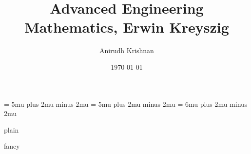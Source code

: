 \documentclass[10pt, oneside]{book}
\author{Anirudh Krishnan}
\title{Advanced Engineering Mathematics, Erwin Kreyszig}
\date{\today}
\numberwithin{equation}{section}
\begin{document}
\renewcommand{\arraystretch}{1.5}
%     

\mainmatter

\setlength{\abovedisplayskip}{2em}
\setlength{\belowdisplayskip}{2em}
\setlength{\abovedisplayshortskip}{2em}
\setlength{\belowdisplayshortskip}{2em}


\thinmuskip = 5mu plus 2mu minus 2mu
\medmuskip = 5mu plus 2mu minus 2mu
\thickmuskip = 6mu plus 2mu minus 2mu


\fancypagestyle
{plain}
{\fancyhf{}
    \fancyhead[]{}
    \renewcommand{\headrulewidth}{0pt}
    \renewcommand{\footrulewidth}{0pt}}

\fancypagestyle
{fancy}{
    \fancyhead[]{}
    \renewcommand{\headrulewidth}{0pt}
    \renewcommand{\footrulewidth}{0pt}}

\pagestyle{fancy}


% 
% 
% 
% 
% 
% 
% 
% 
% 
% 
% 
% 
% 
% 
% 
% 
% 
% 
% 
% 
% 
% 
% 
% 
\end{document}
